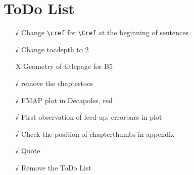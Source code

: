 \chapter*{ToDo List}

\begin{itemize}
    \tightlist
    \item[√] Change \verb|\cref| for \verb|\Cref| at the beginning of sentences.
    \item[√] Change tocdepth to 2
    \item[X] Geometry of titlepage for B5
    \item[√] remove the chaptertocs
    \item[√] FMAP plot in Decapoles, red
    \item[√] First observation of feed-up, errorbars in plot
    \item[√] Check the position of chapterthumbs in appendix
    \item[√] Quote
    \item[√] Remove the ToDo List
\end{itemize}